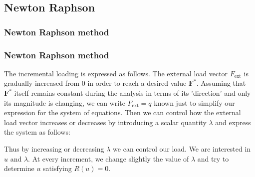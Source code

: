 \documentclass[notes]{beamer}
\begin{document}
\subsection{Newton Raphson}
\begin{frame}
\frametitle{Newton Raphson method}
\end{frame}

\begin{frame}
\frametitle{Newton Raphson method}
The incremental loading is expressed as follows. The external load vector $F_{\mathrm{ext}}$ is gradually increased from 0 in order to reach a desired value $\mathbf{F}^*$. Assuming that  $\mathbf{F}^*$ itself remains constant during the analysis in terms of its 'direction' and only its magnitude is changing, we can write $F_{\mathrm{ext}} = q$ known just to simplify our expression for the system of equations. Then we can control how the external load vector increases or decreases by introducing a scalar quantity $\lambda$ and express the system as follows:

	
Thus by increasing or decreasing $\lambda$ we can control our load. We are interested in 
$u$ and $\lambda$. At every increment, we change slightly the value of $\lambda$ and try 
to determine $u$ satisfying $R(u)= 0$.
	
	
\end{frame}
\end{document}
